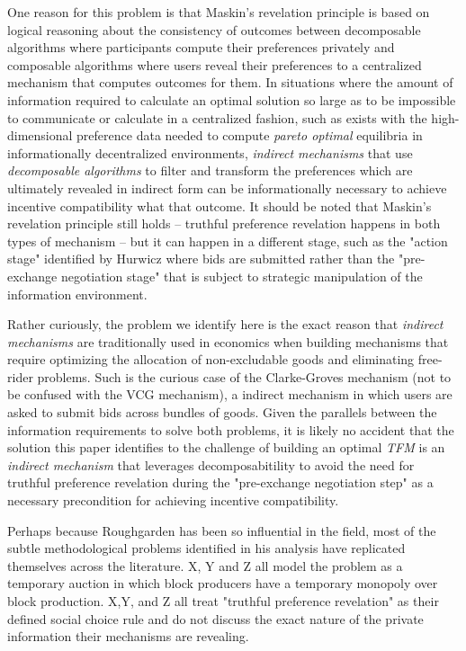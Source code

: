 \documentclass[sigconf,anonymous]{aamas}
\begin{document}
One reason for this problem is that Maskin's revelation principle is based on logical reasoning about the consistency of outcomes between decomposable algorithms where participants compute their preferences privately and composable algorithms where users reveal their preferences to a centralized mechanism that computes outcomes for them. In situations where the amount of information required to calculate an optimal solution so large as to be impossible to communicate or calculate in a centralized fashion, such as exists with the high-dimensional preference data needed to compute \textit{pareto optimal} equilibria in informationally decentralized environments, \textit{indirect mechanisms} that use \textit{decomposable algorithms} to filter and transform the preferences which are ultimately revealed in indirect form can be informationally necessary to achieve incentive compatibility what that outcome. It should be noted that Maskin's revelation principle still holds -- truthful preference revelation happens in both types of mechanism -- but it can happen in a different stage, such as the "action stage" identified by Hurwicz where bids are submitted rather than the "pre-exchange negotiation stage" that is subject to strategic manipulation of the information environment.

Rather curiously, the problem we identify here is the exact reason that \textit{indirect mechanisms} are traditionally used in economics when building mechanisms that require optimizing the allocation of non-excludable goods and eliminating free-rider problems. Such is the curious case of the Clarke-Groves mechanism (not to be confused with the VCG mechanism), a indirect mechanism in which users are asked to submit bids across bundles of goods. Given the parallels between the information requirements to solve both problems, it is likely no accident that the solution this paper identifies to the challenge of building an optimal \textit{TFM} is an \textit{indirect mechanism} that leverages decomposabitility to avoid the need for truthful preference revelation during the "pre-exchange negotiation step" as a necessary precondition for achieving incentive compatibility.

Perhaps because Roughgarden has been so influential in the field, most of the subtle methodological problems identified in his analysis have replicated themselves across the literature. X, Y and Z all model the problem as a temporary auction in which block producers have a temporary monopoly over block production. X,Y, and Z all treat "truthful preference revelation" as their defined social choice rule and do not discuss the exact nature of the private information their mechanisms are revealing.
\end{document}
